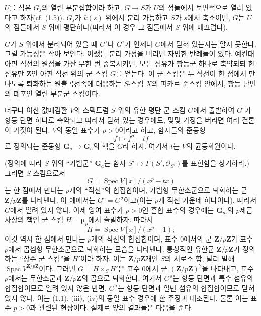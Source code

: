  $U$를 섬유 $G_s$의 열린 부분집합이라 하고,
$G\longrightarrow S$가 $U$의 점들에서 보편적으로 열려 있다고 하자(cf.
(1.5)). $G_s$가 $k(s)$ 위에서 분리 가능하고 $S$가 $s$에서 축소이면,
$G$는 $U$의 점들에서 $S$ 위에 평탄하다(따라서 이 경우 그 점들에서
$S$ 위에 매끄럽다).

 $G$가 $S$ 위에서 분리되어 있을 때 $G^\circ$나
$G^\tau$가 언제나 $G$에서 닫혀 있는지는 알지 못한다. 그럴 가능성은 작아
보인다. 어쨌든 분리 가정을 버리면 자명한 반례들이 있다. 예컨대 아핀 직선의
원점을 가산 무한 번 중복시키면, 모든 섬유가 항등군 하나로 축약되되 한 섬유만
$\mathbf Z$인 아핀 직선 위의 군 스킴 $G$를 얻는다. 이 군 스킴은 두 직선이
한 점에서 만나도록 퇴화하는 원뿔곡선족에 대응하는 $S$-스킴 $X$의 피카르
준스킴 안에서, 항등 단면의 폐포인 열린 부분군 스킴이다.

더구나 이산 값매김환 $V$의 스펙트럼 $S$ 위의 유한 평탄 군 스킴 $G$에서
출발하여 $G^\circ$가 항등 단면 하나로 축약되고 따라서 닫혀 있는 경우에도,
몇몇 가정을 버리면 여러 결론이 거짓이 된다. $V$의 동일 표수가 $p>0$이라고
하고, 함자들의 준동형
\[
f\longmapsto f^p-tf
\]
로 정의되는 준동형 $\mathbf G_a\longrightarrow\mathbf G_a$의 핵을 $G$라
하자. 여기서 $t$는 $V$의 균등화원이다.

(정의에 따라 $S$ 위의 ``가법군'' $\mathbf G_a$는 함자
$S'\longmapsto\Gamma(S',\mathcal O_{S'})$를 표현함을 상기하라.) 그러면
$S$-스킴으로서
\[
G=\operatorname{Spec}V[x]/(x^p-tx)
\]
는 한 점에서 만나는 $p$개의 ``직선''의 합집합이며, 가법형 무한소군으로
퇴화하는 군 $\mathbf Z/p\mathbf Z$를 나타낸다. 이 예에서는
$G^\circ=G^\sigma$이고(이는 $p$개 직선 가운데 하나이다), 따라서
$G$에서 열려 있지 않다. 이제 잉여 표수가 $p>0$인 혼합 표수의 경우에는
$\mathbf G_m$의 $p$제곱 사상의 핵인 군 스킴 $H=\symbf{\mu}_p$에서
출발하자. 따라서
\[
H=\operatorname{Spec}V[x]/(x^p-1) ;
\]
이것 역시 한 점에서 만나는 $p$개의 직선의 합집합이며, 표수 0에서의 군
$\mathbf Z/p\mathbf Z$가 표수 $p$에서 곱셈형 무한소군으로 퇴화하는 모습을
나타낸다. 통상적인 유한군 $\mathbf Z/p\mathbf Z$가 정의하는 ``상수 군
스킴''을 $H'$이라 하자. 이는 $\mathbf Z/p\mathbf Z$개인 $S$의 서로소 합,
달리 말해 $\operatorname{Spec}V^{\mathbf Z/p\mathbf Z}$이다. 그러면
$G=H\times_S H'$은 표수 0에서 군 $(\mathbf Z/p\mathbf Z)^2$을 나타내고,
표수 $p$에서는 무한소군과 $\mathbf Z/p\mathbf Z$의 곱으로 퇴화한다.
여기서 $G^\rho$는 항등 단면과 특수 섬유의 합집합이므로 열려 있지 않은
반면, $G^\sigma$는 항등 단면과 일반 섬유의 합집합이므로 닫혀 있지 않다.
이는 (1.1), (iii), (iv)의 동일 표수 경우에 한 주장과 대조된다. 물론 이는
표수 $p>0$과 관련된 현상이다. 실제로 앞의 결과들은 다음을 준다.

